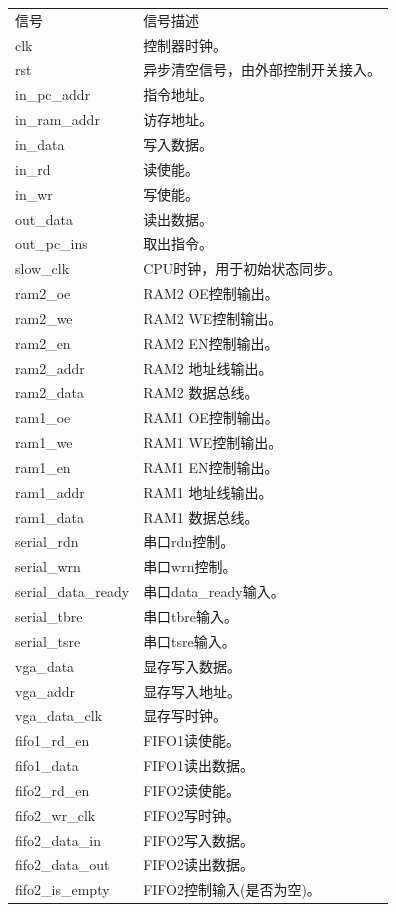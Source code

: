 \begin{center}
    \label{table:memory_ctl}
    \begin{longtable}{p{}p{}}
        \toprule
        信号 & 信号描述 \\
        clk & 控制器时钟。 \\
        rst & 异步清空信号，由外部控制开关接入。 \\
        in\_pc\_addr & 指令地址。 \\
        in\_ram\_addr & 访存地址。 \\
        in\_data & 写入数据。 \\
        in\_rd & 读使能。 \\
        in\_wr & 写使能。 \\
        out\_data & 读出数据。 \\
        out\_pc\_ins & 取出指令。 \\
        slow\_clk & CPU时钟，用于初始状态同步。 \\
        ram2\_oe & RAM2 OE控制输出。 \\
        ram2\_we & RAM2 WE控制输出。 \\
        ram2\_en & RAM2 EN控制输出。 \\
        ram2\_addr & RAM2 地址线输出。 \\
        ram2\_data & RAM2 数据总线。 \\
        ram1\_oe & RAM1 OE控制输出。 \\
        ram1\_we & RAM1 WE控制输出。 \\
        ram1\_en & RAM1 EN控制输出。 \\
        ram1\_addr & RAM1 地址线输出。 \\
        ram1\_data & RAM1 数据总线。 \\
        serial\_rdn & 串口rdn控制。 \\
        serial\_wrn & 串口wrn控制。 \\
        serial\_data\_ready & 串口data\_ready输入。 \\
        serial\_tbre & 串口tbre输入。 \\
        serial\_tsre & 串口tsre输入。 \\
        vga\_data & 显存写入数据。 \\
        vga\_addr & 显存写入地址。 \\
        vga\_data\_clk & 显存写时钟。 \\
        fifo1\_rd\_en & FIFO1读使能。 \\
        fifo1\_data & FIFO1读出数据。 \\
        fifo2\_rd\_en & FIFO2读使能。 \\
        fifo2\_wr\_clk & FIFO2写时钟。 \\
        fifo2\_data\_in & FIFO2写入数据。 \\
        fifo2\_data\_out & FIFO2读出数据。 \\
        fifo2\_is\_empty & FIFO2控制输入(是否为空)。 \\
        \midrule
        \bottomrule
    \end{longtable}
\end{center}
